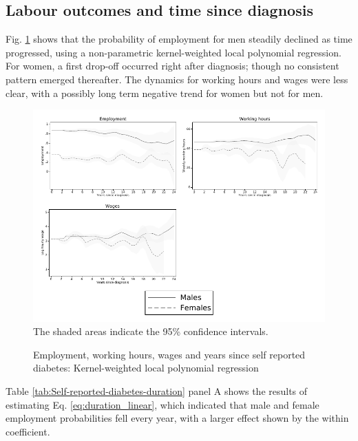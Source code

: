 \documentclass[12pt,english]{article}
\begin{document}
\subsection{\label{sec:duration}Labour outcomes and time since diagnosis }

Fig. \ref{fig:Kernel-weighted-local-polynomial_comb} shows that the probability of employment for men steadily declined as time progressed, using a non-parametric kernel-weighted local polynomial regression. For women, a first drop-off occurred right after diagnosis; though no consistent pattern emerged thereafter. The dynamics for working hours and wages were less clear, with a possibly long term negative trend for women but not for men.

\begin{figure}[!ht]
	\caption{\label{fig:Kernel-weighted-local-polynomial_comb}Employment, working hours, wages and years since self reported diabetes:  Kernel-weighted local polynomial regression}%
	\begin{center}
		\includegraphics[width=\linewidth]{figures/lpoly_combined.pdf}\\
		\footnotesize{ The shaded areas indicate the 95\% confidence intervals.}
	\end{center}
\end{figure}


Table \ref{tab:Self-reported-diabetes-duration} panel A shows the results of estimating Eq. \ref{eq:duration_linear}, which indicated that male and female employment probabilities fell every year, with a larger effect shown by the within coefficient. 
\end{document}
